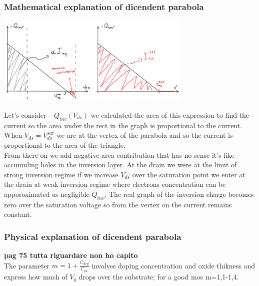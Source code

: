 \subsubsection{Mathematical explanation of dicendent parabola}

\centering
\includegraphics[width=0.7\textwidth]{mathexpl.png}\\
\raggedright

Let's consider $-Q_{inv}(V_{ds})$ we calculated the area of this expression to find the current so the area under the rect in the graph is proportional to the current. When $V_{ds}=V_{ds}^{sat}$ we are at the vertex of the parabola and so the current is proportional to the area of the triangle.\\
From there on we add negative area contribution that has no sense it's like accumuling holes in the inversion layer. At the drain we were at the limit of strong inversion regime if we increase $V_{ds}$ over the saturation point we enter at the drain at weak inversion regime where electrons concentration can be apporoximated as negligible $Q_{inv}$. The real graph of the inversion charge becomes zero over the saturation voltage so from the vertex on the current remains constant.\\

\subsubsection{Physical explanation of dicendent parabola}
{\bf pag 75 tutta riguardare non ho capito}\\

The parameter $m=1+\frac{C_{dep}}{C_{ox}}$ involves doping concentration and oxide thikness and express how much of $V_g$ drops over the substrate; for a good mos m=1,1-1,4.\\

